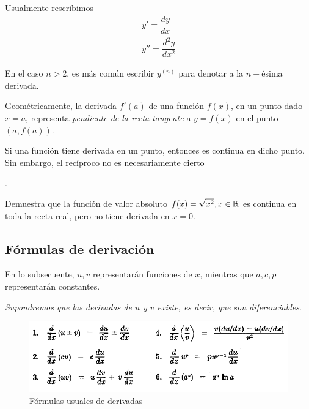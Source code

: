 {}
  Usualmente rescribimos
  \begin{align}
   y' = \dfrac{dy}{dx} \\
   y'' = \dfrac{d^{2}y}{dx^{2}}
   \end{align}

   En el caso $n>2$, es más común escribir
 $   y^{(n)}$ para denotar a la $n-$ésima derivada.


\begin{observacion}

  Geométricamente, la derivada $f'(a)$ de una función $f(x)$, en un punto dado $x=a$, representa \emph{pendiente de la recta tangente} a $y=f(x)$ en el punto $\left( a,f(a) \right)$.

\end{observacion}

\begin{observacion}

  Si una función tiene derivada en un punto, entonces es continua en dicho punto.
  Sin embargo, el recíproco no es necesariamente cierto
\end{observacion}.

  \begin{resuelto}
	Demuestra que la función de valor absoluto $ f(x) = \sqrt{x^2}, x\in \mathbb{R} $ es continua en toda la recta real, pero no tiene derivada en $ x=0 $.
  \end{resuelto}


\subsection{Fórmulas de derivación}
{}
  En lo subsecuente, $u,v$ representarán funciones de $x$, mientras que $a,c,p$ representarán constantes.


  \emph{Supondremos que las derivadas de $u$ y $v$ existe, es decir, que son diferenciables}.


{}
  \begin{figure}
 \centering
 \includegraphics[width=.7\textwidth,keepaspectratio=true]{./calculo/formulas_derivadas_01.png}
 \caption{Fórmulas usuales de derivadas}
 \label{fig:formulas_derivadas_01}
\end{figure}



